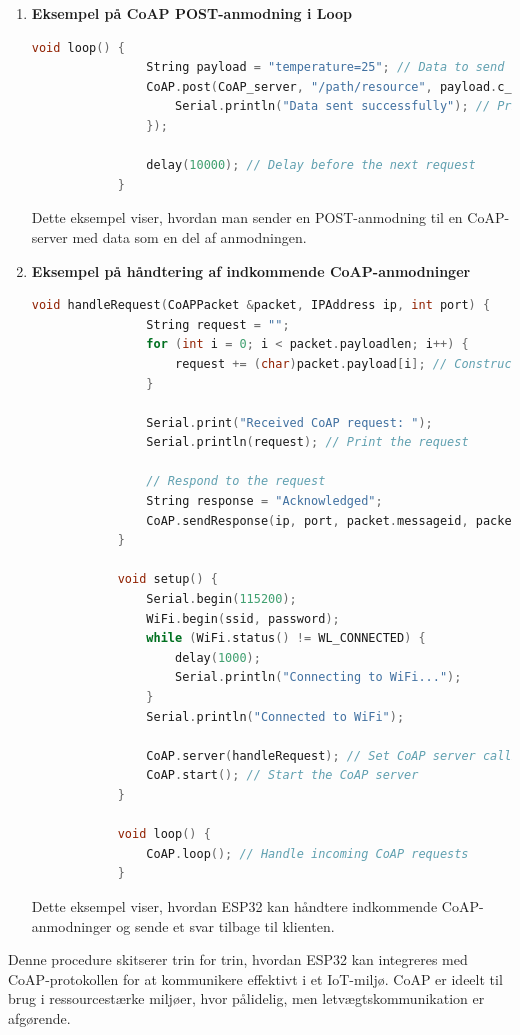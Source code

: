 \documentclass[12pt,a4paper]{book}
\begin{document}
\begin{enumerate}
\begin{lstlisting}[language=C++, caption=Syntaks]
				delay(10000); // Delay before the next request
			}
		\end{lstlisting}
		\noindent Dette eksempel viser, hvordan man sender en GET-anmodning til en CoAP-server og modtager et svar.
		
		\item \textbf{Eksempel på CoAP POST-anmodning i Loop}
		\begin{lstlisting}[language=C++, caption=Syntaks]
			void loop() {
				String payload = "temperature=25"; // Data to send
				CoAP.post(CoAP_server, "/path/resource", payload.c_str(), payload.length(), [](CoAPPacket &packet, IPAddress ip, int port) {
					Serial.println("Data sent successfully"); // Print success message
				});
				
				delay(10000); // Delay before the next request
			}
		\end{lstlisting}
		\noindent Dette eksempel viser, hvordan man sender en POST-anmodning til en CoAP-server med data som en del af anmodningen.
		
		\item \textbf{Eksempel på håndtering af indkommende CoAP-anmodninger}
		\begin{lstlisting}[language=C++, caption=Syntaks]
			void handleRequest(CoAPPacket &packet, IPAddress ip, int port) {
				String request = "";
				for (int i = 0; i < packet.payloadlen; i++) {
					request += (char)packet.payload[i]; // Construct request string
				}
				
				Serial.print("Received CoAP request: ");
				Serial.println(request); // Print the request
				
				// Respond to the request
				String response = "Acknowledged";
				CoAP.sendResponse(ip, port, packet.messageid, packet.token, response.c_str(), response.length(), packet.type);
			}
			
			void setup() {
				Serial.begin(115200);
				WiFi.begin(ssid, password);
				while (WiFi.status() != WL_CONNECTED) {
					delay(1000);
					Serial.println("Connecting to WiFi...");
				}
				Serial.println("Connected to WiFi");
				
				CoAP.server(handleRequest); // Set CoAP server callback
				CoAP.start(); // Start the CoAP server
			}
			
			void loop() {
				CoAP.loop(); // Handle incoming CoAP requests
			}
		\end{lstlisting}
		\noindent Dette eksempel viser, hvordan ESP32 kan håndtere indkommende CoAP-anmodninger og sende et svar tilbage til klienten.
	\end{enumerate}
	\noindent Denne procedure skitserer trin for trin, hvordan ESP32 kan integreres med CoAP-protokollen for at kommunikere effektivt i et IoT-miljø. CoAP er ideelt til brug i ressourcestærke miljøer, hvor pålidelig, men letvægtskommunikation er afgørende.
	
\end{document}
